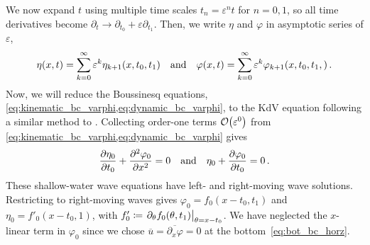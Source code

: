 \documentclass{jfm}
\renewcommand*{\epsilon}{\varepsilon}
\begin{document}
We now expand $t$ using multiple time scales $t_n =
\epsilon^n t$ for $n= 0,1$, so all time derivatives become $\partial_t \to
\partial_{t_0} + \epsilon \partial_{t_1}$.
Then, we write $\eta$ and $\varphi$ in asymptotic series of $\epsilon$,
\begin{equation}
  \eta(x,t) = \sum_{k=0}^{\infty} \epsilon^k
    \eta_{k+1}(x,t_0,t_1) \qq{and}
  \varphi(x,t) = \sum_{k=0}^{\infty} \epsilon^k
    \varphi_{k+1}(x,t_0,t_1,) \,.
\end{equation}
Now, we will reduce the Boussinesq equations,
\cref{eq:kinematic_bc_varphi,eq:dynamic_bc_varphi}, to the KdV equation
following a similar method to \citet{mei2005nonlinear}.
Collecting order-one terms $\order{\epsilon^0}$ from
\cref{eq:kinematic_bc_varphi,eq:dynamic_bc_varphi} gives
\begin{equation}
  \pdv{\eta_0}{t_0} + \pdv[2]{\varphi_0}{x} = 0 \qq{and}
  \eta_0 + \pdv{\varphi_0}{t_0} = 0 \,.
\end{equation}
These shallow-water wave equations have left- and right-moving wave
solutions.
Restricting to right-moving waves gives $\varphi_0 = f_0(x-t_0,t_1)$ and
$\eta_0 = f'_0(x-t_0,1)$, with $f_0' \coloneqq \eval{\partial_{\theta}
f_0(\theta,t_1)}_{\theta = x-t_0}$.
We have neglected the $x$-linear term in $\varphi_0$ since we chose
$\overline{u} = \overline{\partial_x \varphi} = 0$ at the
bottom~\cref{eq:bot_bc_horz}.
\end{document}
